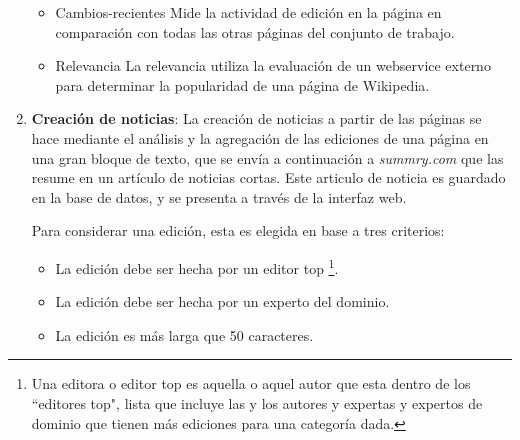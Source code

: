\begin{enumerate}
\begin{itemize}
		\item Cambios-recientes
		Mide la actividad de edición en la página en comparación con todas las otras páginas del conjunto de trabajo.
		
		\item Relevancia
		La relevancia utiliza la evaluación de un webservice externo para determinar la popularidad de una página de Wikipedia.	
		
	\end{itemize}
	\item \textbf{Creación de noticias}:
	La creación de noticias a partir de las páginas se hace mediante el análisis y la agregación de las ediciones de una página en una gran bloque de texto, que se envía a continuación a \emph{summry.com} que las resume en un artículo de noticias cortas. Este articulo de noticia es guardado en la base de datos, y se presenta a través de la interfaz web.
	
	Para considerar una edición, esta es elegida en base a tres criterios:
	\begin{itemize}
		\item La edición debe ser hecha por un editor top \footnote{Una editora o editor top es aquella o aquel autor que esta dentro de los ``editores top", lista que incluye las y los autores y expertas y expertos de dominio que tienen más ediciones para una categoría dada.}.
		\item La edición debe ser hecha por un experto del dominio.
		\item La edición es más larga que 50 caracteres.
	\end{itemize}
	
\end{enumerate}


